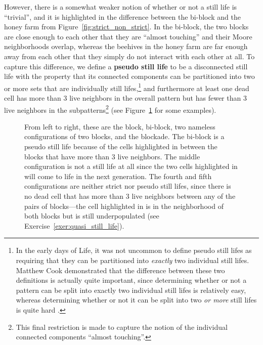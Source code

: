 However, there is a somewhat weaker notion of whether or not a still life is ``trivial'', and it is highlighted in the difference between the bi-block and the honey farm from Figure~\ref{fig:strict_non_strict}. In the bi-block, the two blocks are close enough to each other that they are ``almost touching'' and their Moore neighborhoods overlap, whereas the beehives in the honey farm are far enough away from each other that they simply do not interact with each other at all. To capture this difference, we define a \textbf{pseudo still life} to be a disconnected still life with the property that its connected components can be partitioned into two or more sets that are individually still lifes,\footnote{In the early days of Life, it was not uncommon to define pseudo still lifes as requiring that they can be partitioned into \emph{exactly} two individual still lifes. Matthew Cook demonstrated that the difference between these two definitions is actually quite important, since determining whether or not a pattern can be split into exactly two individual still lifes is relatively easy, whereas determining whether or not it can be split into two \emph{or more} still lifes is quite hard \cite{Coo03}.} and furthermore at least one dead cell has more than $3$ live neighbors in the overall pattern but has fewer than $3$ live neighbors in the subpatterns\footnote{This final restriction is made to capture the notion of the individual connected components ``almost touching''.} (see Figure~\ref{fig:pseudo_not_pseudo} for some examples).

\begin{figure}[!htb]
	\centering{}
	\caption{From left to right, these are the block, bi-block, two nameless configurations of two blocks, and the blockade. The bi-block is a pseudo still life because of the cells highlighted in  between the blocks that have more than $3$ live neighbors. The middle configuration is not a still life at all since the two cells highlighted in  will come to life in the next generation. The fourth and fifth configurations are neither strict nor pseudo still lifes, since there is no dead cell that has more than $3$ live neighbors between any of the pairs of blocks---the cell highlighted in  is in the neighborhood of both blocks but is still underpopulated (see Exercise~\ref{exer:quasi_still_life}).}\label{fig:pseudo_not_pseudo}
\end{figure}

